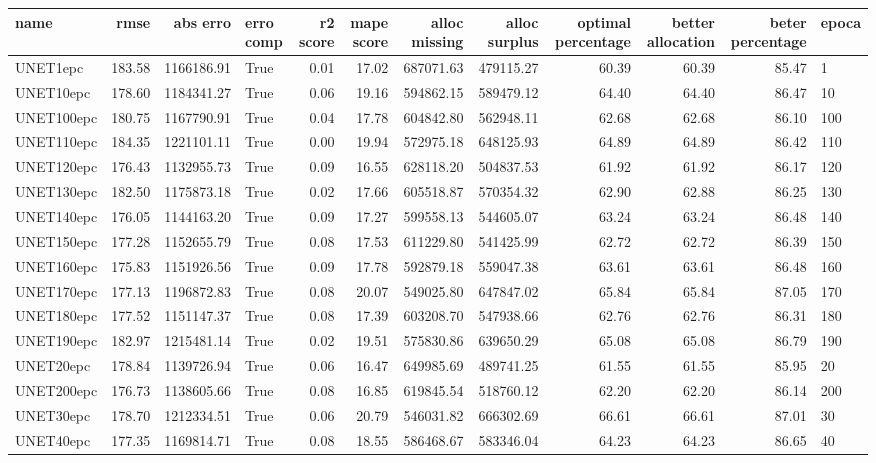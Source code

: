 \begin{tabular}{lrrlrrrrrrrl}
\toprule
name & rmse & abs erro & erro comp & r2 score & mape score & alloc missing & alloc surplus & optimal percentage & better allocation & beter percentage & epoca \\
\midrule
UNET1epc & 183.58 & 1166186.91 & True & 0.01 & 17.02 & 687071.63 & 479115.27 & 60.39 & 60.39 & 85.47 & 1 \\
UNET10epc & 178.60 & 1184341.27 & True & 0.06 & 19.16 & 594862.15 & 589479.12 & 64.40 & 64.40 & 86.47 & 10 \\
UNET100epc & 180.75 & 1167790.91 & True & 0.04 & 17.78 & 604842.80 & 562948.11 & 62.68 & 62.68 & 86.10 & 100 \\
UNET110epc & 184.35 & 1221101.11 & True & 0.00 & 19.94 & 572975.18 & 648125.93 & 64.89 & 64.89 & 86.42 & 110 \\
UNET120epc & 176.43 & 1132955.73 & True & 0.09 & 16.55 & 628118.20 & 504837.53 & 61.92 & 61.92 & 86.17 & 120 \\
UNET130epc & 182.50 & 1175873.18 & True & 0.02 & 17.66 & 605518.87 & 570354.32 & 62.90 & 62.88 & 86.25 & 130 \\
UNET140epc & 176.05 & 1144163.20 & True & 0.09 & 17.27 & 599558.13 & 544605.07 & 63.24 & 63.24 & 86.48 & 140 \\
UNET150epc & 177.28 & 1152655.79 & True & 0.08 & 17.53 & 611229.80 & 541425.99 & 62.72 & 62.72 & 86.39 & 150 \\
UNET160epc & 175.83 & 1151926.56 & True & 0.09 & 17.78 & 592879.18 & 559047.38 & 63.61 & 63.61 & 86.48 & 160 \\
UNET170epc & 177.13 & 1196872.83 & True & 0.08 & 20.07 & 549025.80 & 647847.02 & 65.84 & 65.84 & 87.05 & 170 \\
UNET180epc & 177.52 & 1151147.37 & True & 0.08 & 17.39 & 603208.70 & 547938.66 & 62.76 & 62.76 & 86.31 & 180 \\
UNET190epc & 182.97 & 1215481.14 & True & 0.02 & 19.51 & 575830.86 & 639650.29 & 65.08 & 65.08 & 86.79 & 190 \\
UNET20epc & 178.84 & 1139726.94 & True & 0.06 & 16.47 & 649985.69 & 489741.25 & 61.55 & 61.55 & 85.95 & 20 \\
UNET200epc & 176.73 & 1138605.66 & True & 0.08 & 16.85 & 619845.54 & 518760.12 & 62.20 & 62.20 & 86.14 & 200 \\
UNET30epc & 178.70 & 1212334.51 & True & 0.06 & 20.79 & 546031.82 & 666302.69 & 66.61 & 66.61 & 87.01 & 30 \\
UNET40epc & 177.35 & 1169814.71 & True & 0.08 & 18.55 & 586468.67 & 583346.04 & 64.23 & 64.23 & 86.65 & 40 \\

\end{tabular}
